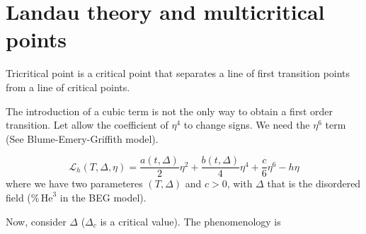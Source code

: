 \documentclass[../main/main.tex]{subfiles}
\begin{document}
\section{Landau theory and multicritical points}
Tricritical point is a critical point that separates a line of first transition points from a line of critical points.
\begin{remark}
The introduction of a cubic term is not the only way to obtain a first order transition. Let allow the coefficient of \( \eta ^4 \) to change signs. We need the \( \eta ^6 \) term (See Blume-Emery-Griffith model).
\end{remark}
\begin{equation}
  \mathcal{L}_h (T, \Delta, \eta ) = \frac{a (t,\Delta )}{2} \eta ^2 + \frac{b(t,\Delta )}{4} \eta ^4 + \frac{c}{6} \eta ^6 - h \eta
\end{equation}
where we have two parameteres \( (T,\Delta ) \) and \( c>0 \), with \( \Delta  \) that is the disordered field (\( \% \, \text{He}^3\) in the BEG model).

Now, consider \( \Delta  \) (\( \Delta _c \) is a critical value). The phenomenology is
\end{document}
